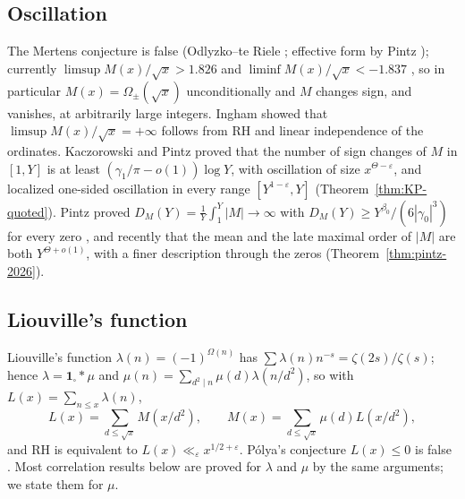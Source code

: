 \documentclass[11pt]{amsart}
\numberwithin{equation}{section}
\theoremstyle{plain}
\theoremstyle{definition}
\theoremstyle{remark}
\newcommand{\eps}{\varepsilon}
\begin{document}
\subsection{Oscillation}
The Mertens conjecture is false (Odlyzko--te Riele \cite{OdlyzkoTeRiele1985};
effective form by Pintz \cite{Pintz1987}); currently
$\limsup M(x)/\sqrt x>1.826$ and $\liminf M(x)/\sqrt x<-1.837$
\cite{Hurst18}, so in particular $M(x)=\Omega_\pm(\sqrt x)$ unconditionally
and $M$ changes sign, and vanishes, at arbitrarily large integers. Ingham
\cite{Ingham1942} showed that $\limsup M(x)/\sqrt x=+\infty$ follows from RH
and linear independence of the ordinates. Kaczorowski and Pintz \cite{KP86}
proved that the number of sign changes of $M$ in $[1,Y]$ is at least
$(\gamma_1/\pi-o(1))\log Y$, with oscillation of size $x^{\Theta-\eps}$, and
localized one-sided oscillation in every range $[Y^{1-\eps},Y]$
(Theorem~\ref{thm:KP-quoted}). Pintz proved $D_M(Y)=\frac1Y\int_1^Y|M|\to\infty$
with $D_M(Y)\ge Y^{\beta_0}/(6|\gamma_0|^3)$ for every zero
\cite{Pintz1983}, and recently that the mean and the late maximal order of
$|M|$ are both $Y^{\Theta+o(1)}$, with a finer description through the
zeros \cite{Pintz2026} (Theorem~\ref{thm:pintz-2026}).

\subsection{Liouville's function}
Liouville's function $\lambda(n)=(-1)^{\Omega(n)}$ has
$\sum\lambda(n)n^{-s}=\zeta(2s)/\zeta(s)$; hence $\lambda=\mathbf 1_{\square}*\mu$
and $\mu(n)=\sum_{d^2\mid n}\mu(d)\lambda(n/d^2)$, so with
$L(x)=\sum_{n\le x}\lambda(n)$,
\[
L(x)=\sum_{d\le\sqrt x}M(x/d^2),\qquad M(x)=\sum_{d\le\sqrt x}\mu(d)L(x/d^2),
\]
and RH is equivalent to $L(x)\ll_\eps x^{1/2+\eps}$. Pólya's conjecture
$L(x)\le0$ is false \cite{Haselgrove1958}. Most correlation results below are
proved for $\lambda$ and $\mu$ by the same arguments; we state them for $\mu$.
\end{document}
